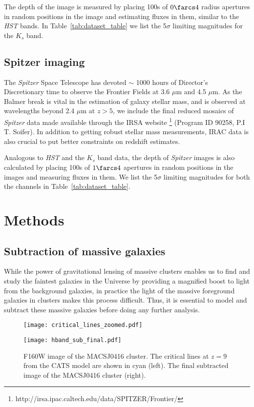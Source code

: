 \documentclass[twocolumn]{aastex63}
\begin{document}
The depth of the image is measured by placing 100s of $0\farcs4$ radius apertures in random positions in the image and estimating fluxes in them, similar to the \textit{HST} bands. In Table~\ref{tab:dataset_table} we list the 5$\sigma$ limiting magnitudes for the $K_{s}$ band. 

\subsection{Spitzer imaging} \label{sec:spitzerdata}

The \textit{Spitzer} Space Telescope has devoted $\sim$ 1000 hours of Director's Discretionary time to observe the Frontier Fields at 3.6 $\mu$m and 4.5 $\mu$m. As the Balmer break is vital in the estimation of galaxy stellar mass, and is observed at wavelengths beyond 2.4 $\mu$m at $z>5$, we include the final reduced mosaics of \textit{Spitzer} data made available through the IRSA website \footnote[3]{http://irsa.ipac.caltech.edu/data/SPITZER/Frontier/} (Program ID 90258, P.I T. Soifer). In addition to getting robust stellar mass measurements, IRAC data is also crucial to put better constraints on redshift estimates.

Analogous to \textit{HST} and the $K_{s}$ band data, the depth of \textit{Spitzer} images is also calculated by placing 100s of $1\farcs4$ apertures in random positions in the images and measuring fluxes in them. We list the 5$\sigma$ limiting magnitudes for both the channels in Table~\ref{tab:dataset_table}.

\section{Methods}\label{sec:methods}
\subsection{Subtraction of massive galaxies}
While the power of gravitational lensing of massive clusters enables us to find and study the faintest galaxies in the Universe by providing a magnified boost to light from the background galaxies, in practice the light of the massive foreground galaxies in clusters makes this process difficult. Thus, it is essential to model and subtract these massive galaxies before doing any further analysis. 

\begin{figure*}
\centering
\begin{minipage}{0.49\textwidth}
\centering
\texttt{[image: critical\_lines\_zoomed.pdf]}
\end{minipage}
\begin{minipage}{0.49\textwidth}
\centering
\texttt{[image: hband\_sub\_final.pdf]}
\end{minipage}
\caption{F160W image of the MACSJ0416 cluster. The critical lines at $z=9$ from the CATS model \citep{Jauzac2014} are shown in cyan (left). The final subtracted image of the MACSJ0416 cluster (right).}
\label{fig:critical_lines}
\end{figure*}
\end{document}
